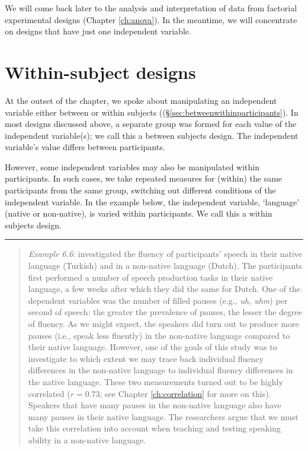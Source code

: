 \documentclass[
]{book}
\begin{document}
We will come back later to the analysis and interpretation of data from factorial experimental designs (Chapter \ref{ch:anova}).
In the meantime, we will concentrate on designs that have just one independent variable.

\hypertarget{sec:within-subject-designs}{%
\section{Within-subject designs}\label{sec:within-subject-designs}}

At the outset of the chapter, we spoke about manipulating an independent variable either between or within subjects ((§\ref{sec:betweenwithinparticipants}). In most designs discussed above, a separate group was formed for each value of the independent variable(s); we call this a between subjects design. The independent variable's value differs between participants.

However, some independent variables may also be manipulated within participants. In such cases, we take repeated measures for (within) the same participants from the same group, switching out different conditions of the independent variable. In the example below, the independent variable, `language' (native or non-native), is varied within participants. We call this a within subjects design.

\begin{center}\rule{0.5\linewidth}{0.5pt}\end{center}

\begin{quote}
\emph{Example 6.6}: \citet{JGSH13} investigated the fluency of participants' speech in their native language (Turkish) and in a non-native language (Dutch). The participants first performed a number of speech production tasks in their native language, a few weeks after which they did the same for Dutch. One of the dependent variables was the number of filled pauses (e.g., \emph{uh, uhm}) per second of speech: the greater the prevalence of pauses, the lesser the degree of fluency. As we might expect, the speakers did turn out to produce more pauses (i.e., speak less fluently) in the non-native language compared to their native language. However, one of the goals of this study was to investigate to which extent we may trace back individual fluency differences in the non-native language to individual fluency differences in the native language. These two measurements turned out to be highly correlated (\(r = 0.73\); see Chapter \ref{ch:correlation} for more on this). Speakers that have many pauses in the non-native language also have many pauses in their native language. The researchers argue that we must take this correlation into account when teaching and testing speaking ability in a non-native language.
\end{quote}
\end{document}
